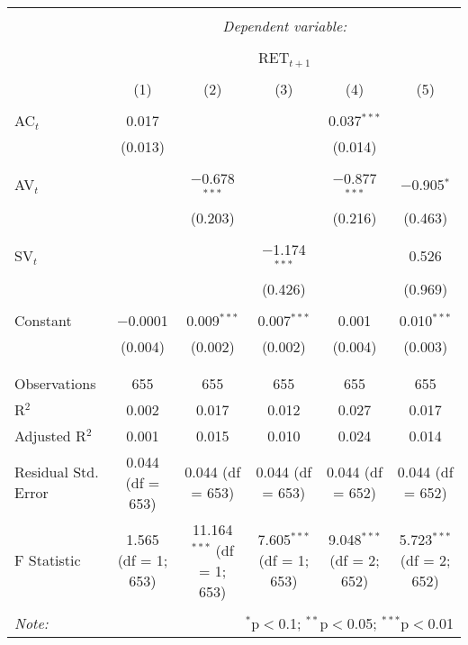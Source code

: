 
\begin{table}[!htbp] \centering 
  \caption{} 
  \label{} 
\begin{tabular}{@{\extracolsep{5pt}}lccccc} 
\\[-1.8ex]\hline 
\hline \\[-1.8ex] 
 & \multicolumn{5}{c}{\textit{Dependent variable:}} \\ 
\cline{2-6} 
\\[-1.8ex] & \multicolumn{5}{c}{RET$_{t+1}$} \\ 
\\[-1.8ex] & (1) & (2) & (3) & (4) & (5)\\ 
\hline \\[-1.8ex] 
 AC$_{t}$ & 0.017 &  &  & 0.037$^{***}$ &  \\ 
  & (0.013) &  &  & (0.014) &  \\ 
  & & & & & \\ 
 AV$_{t}$ &  & $-$0.678$^{***}$ &  & $-$0.877$^{***}$ & $-$0.905$^{*}$ \\ 
  &  & (0.203) &  & (0.216) & (0.463) \\ 
  & & & & & \\ 
 SV$_{t}$ &  &  & $-$1.174$^{***}$ &  & 0.526 \\ 
  &  &  & (0.426) &  & (0.969) \\ 
  & & & & & \\ 
 Constant & $-$0.0001 & 0.009$^{***}$ & 0.007$^{***}$ & 0.001 & 0.010$^{***}$ \\ 
  & (0.004) & (0.002) & (0.002) & (0.004) & (0.003) \\ 
  & & & & & \\ 
\hline \\[-1.8ex] 
Observations & 655 & 655 & 655 & 655 & 655 \\ 
R$^{2}$ & 0.002 & 0.017 & 0.012 & 0.027 & 0.017 \\ 
Adjusted R$^{2}$ & 0.001 & 0.015 & 0.010 & 0.024 & 0.014 \\ 
Residual Std. Error & 0.044 (df = 653) & 0.044 (df = 653) & 0.044 (df = 653) & 0.044 (df = 652) & 0.044 (df = 652) \\ 
F Statistic & 1.565 (df = 1; 653) & 11.164$^{***}$ (df = 1; 653) & 7.605$^{***}$ (df = 1; 653) & 9.048$^{***}$ (df = 2; 652) & 5.723$^{***}$ (df = 2; 652) \\ 
\hline 
\hline \\[-1.8ex] 
\textit{Note:}  & \multicolumn{5}{r}{$^{*}$p$<$0.1; $^{**}$p$<$0.05; $^{***}$p$<$0.01} \\ 
\end{tabular} 
\end{table} 
